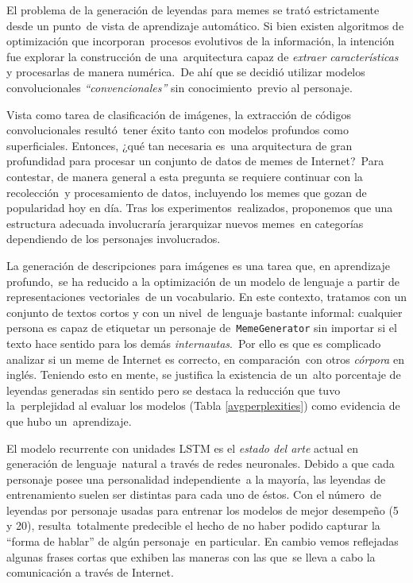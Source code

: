 \noindent
El problema de la generación de leyendas para memes se trató estrictamente desde un punto\
de vista de aprendizaje automático. Si bien existen algoritmos de optimización que incorporan\
procesos evolutivos de la información, la intención fue explorar la construcción de una\
arquitectura capaz de \emph{extraer características} y procesarlas de manera numérica.\
De ahí que se decidió utilizar modelos convolucionales \emph{``convencionales''} sin conocimiento\
previo al personaje.\par
Vista como tarea de clasificación de imágenes, la extracción de códigos convolucionales resultó\
tener éxito tanto con modelos profundos como superficiales. Entonces, ¿qué tan necesaria es\
una arquitectura de gran profundidad para procesar un conjunto de datos de memes de Internet?\
Para contestar, de manera general a esta pregunta se requiere continuar con la recolección\
y procesamiento de datos, incluyendo los memes que gozan de popularidad hoy en día. Tras los experimentos\
realizados, proponemos que una estructura adecuada involucraría jerarquizar nuevos memes\
en categorías dependiendo de los personajes involucrados.\par
La generación de descripciones para imágenes es una tarea que, en aprendizaje profundo,\
se ha reducido a la optimización de un modelo de lenguaje a partir de representaciones vectoriales\
de un vocabulario. En este contexto, tratamos con un conjunto de textos cortos y con un nivel\
de lenguaje bastante informal: cualquier persona es capaz de etiquetar un personaje de\
\verb+MemeGenerator+ sin importar si el texto hace sentido para los demás \emph{internautas}.\
Por ello es que es complicado analizar si un meme de Internet es correcto, en comparación\
con otros \emph{córpora} en inglés. Teniendo esto en mente, se justifica la existencia de un\
alto porcentaje de leyendas generadas sin sentido pero se destaca la reducción que tuvo la\
perplejidad al evaluar los modelos (Tabla \ref{avgperplexities}) como evidencia de que hubo un\
aprendizaje.\par
El modelo recurrente con unidades LSTM es el \emph{estado del arte} actual en generación de lenguaje\
natural a través de redes neuronales. Debido a que cada personaje posee una personalidad independiente\
a la mayoría, las leyendas de entrenamiento suelen ser distintas para cada uno de éstos. Con el número\
de leyendas por personaje usadas para entrenar los modelos de mejor desempeño (5 y 20), resulta\
totalmente predecible el hecho de no haber podido capturar la ``forma de hablar'' de algún personaje\
en particular. En cambio vemos reflejadas algunas frases cortas que exhiben las maneras con las que\
se lleva a cabo la comunicación a través de Internet.

